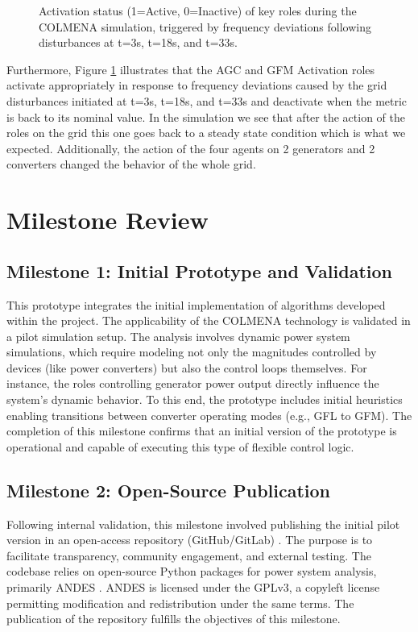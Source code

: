 \documentclass{article}
\begin{document}
\begin{figure}[h!]
    \caption{Activation status (1=Active, 0=Inactive) of key roles during the COLMENA simulation, triggered by frequency deviations following disturbances at t=3s, t=18s, and t=33s.}
    \label{fig:activation_plots}
\end{figure}
    
Furthermore, Figure \ref{fig:activation_plots} illustrates that the AGC and GFM Activation roles activate appropriately in response to frequency deviations caused by the grid disturbances initiated at t=3s, t=18s, and t=33s and deactivate when the metric is back to its nominal value. In the simulation we see that after the action of the roles on the grid this one goes back to a steady state condition which is what we expected. Additionally, the action of the four agents on 2 generators and 2 converters changed the behavior of the whole grid. 

\section{Milestone Review}

\subsection*{Milestone 1: Initial Prototype and Validation}

This prototype integrates the initial implementation of algorithms developed within the project. The applicability of the COLMENA technology is validated in a pilot simulation setup. The analysis involves dynamic power system simulations, which require modeling not only the magnitudes controlled by devices (like power converters) but also the control loops themselves. For instance, the roles controlling generator power output directly influence the system's dynamic behavior. To this end, the prototype includes initial heuristics enabling transitions between converter operating modes (e.g., GFL to GFM). The completion of this milestone confirms that an initial version of the prototype is operational and capable of executing this type of flexible control logic.

\subsection*{Milestone 2: Open-Source Publication}

Following internal validation, this milestone involved publishing the initial pilot version in an open-access repository (GitHub/GitLab) \cite{git:eroots}. The purpose is to facilitate transparency, community engagement, and external testing. The codebase relies on open-source Python packages for power system analysis, primarily ANDES \cite{article:andes}. ANDES is licensed under the GPLv3, a copyleft license permitting modification and redistribution under the same terms. The publication of the repository fulfills the objectives of this milestone.
\end{document}
